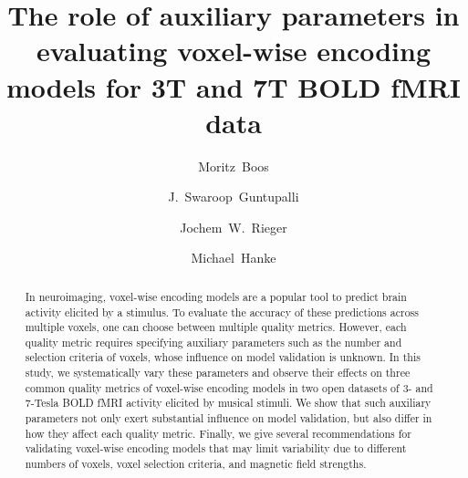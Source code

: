 
\newcommand{\beginsupplement}{%
        \setcounter{table}{0}
        \renewcommand{\thetable}{S\arabic{table}}%
        \setcounter{figure}{0}
        \renewcommand{\thefigure}{S\arabic{figure}}%
     }


\usepackage{adjustbox}
\usepackage[natbibapa]{apacite}


\title{The role of auxiliary parameters in evaluating voxel-wise encoding models for 3T and 7T BOLD fMRI data}


\author[1]{Moritz~Boos}
\author[2]{J.~Swaroop~Guntupalli}
\author[1]{Jochem~W.~Rieger}
\author[3,4]{Michael~Hanke}

\maketitle

\begin{abstract}
In neuroimaging, voxel-wise encoding models are a popular tool to predict brain activity elicited by a stimulus.
To evaluate the accuracy of these predictions across multiple voxels, one can choose between multiple quality metrics.
However, each quality metric requires specifying auxiliary parameters such as the number and selection criteria of voxels, whose influence on model validation is unknown.
In this study, we systematically vary these parameters and observe their effects on three common quality metrics of voxel-wise encoding models in two open datasets of 3- and 7-Tesla BOLD fMRI activity elicited by musical stimuli.
We show that such auxiliary parameters not only exert substantial influence on model validation, but also differ in how they affect each quality metric.
Finally, we give several recommendations for validating voxel-wise encoding models that may limit variability due to different numbers of voxels, voxel selection criteria, and magnetic field strengths.
\end{abstract}

\clearpage


